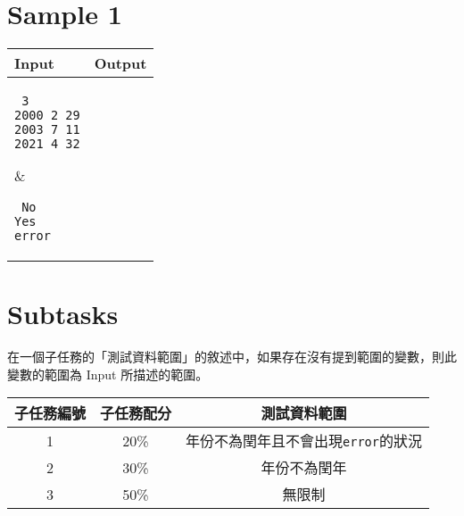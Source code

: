 \documentclass[11pt,a4paper]{article}
\begin{document}
\newpage

\section*{Sample 1}
\begin{longtable}[!h]{|p{}|p{}|}
\hline
\textbf {Input}	& \textbf {Output} \\
\hline
\parbox[t]{0.5\textwidth} %
{ \tt
3 \\
2000 2 29 \\
2003 7 11 \\
2021 4 32 \\
} &
\parbox[t]{0.5\textwidth}
{ \tt
No\\
Yes\\
error\\

} \\
\hline
\end{longtable}


\section*{Subtasks}

在一個子任務的「測試資料範圍」的敘述中，如果存在沒有提到範圍的變數，則此變數的範圍為 Input 所描述的範圍。

\begin{center}
 \begin{tabular}{||c c c||} 
 \hline
 子任務編號 & 子任務配分 & 測試資料範圍 \\  
 \hline
 \hline
 1 & 20\% & 年份不為閏年且不會出現\texttt{error}的狀況 \\ 
 \hline
 2 & 30\% & 年份不為閏年\\
 \hline 
 3 & 50\% & 無限制 \\
 \hline

\end{tabular}
\end{center}
\end{document}
